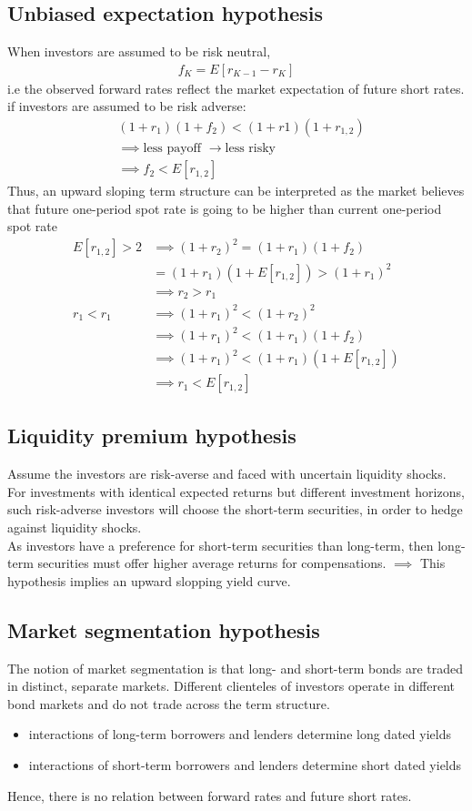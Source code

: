 \documentclass{article}
\theoremstyle{definition}
\theoremstyle{thrm}
\theoremstyle{lma}
\theoremstyle{ppst}
\theoremstyle{crlr}
\begin{document}
\subsection{Unbiased expectation hypothesis}
When investors are assumed to be risk neutral, 
\begin{align*}
	f_K = E[r_{K-1}-r_K]
\end{align*}
i.e the observed forward rates reflect the market expectation of future short rates.\\
if investors are assumed to be risk adverse:
\begin{align*}
	&(1+r_1)(1+f_2)< (1+r1)(1+r_{1,2})\\
	&\implies \text{less payoff } \rightarrow \text{less risky}\\
	&\implies f_2 < E[r_{1,2}]
\end{align*}
Thus, an upward sloping term structure can be interpreted as the market believes that future one-period spot rate is going to be higher than current one-period spot rate
\begin{align*}
	E[r_{1,2}] > 2 &\implies (1+r_2)^2 = (1+r_1)(1+f_2)\\
	&= (1+r_1)(1+E[r_{1,2}]) > (1+r_1)^2\\
	&\implies r_2>r_1\\
	r_1<r_1 &\implies (1+r_1)^2 < (1+r_2)^2\\
	&\implies (1+r_1)^2 < (1+r_1)(1+f_2)\\
	&\implies (1+r_1)^2 < (1+r_1)(1+E[r_{1,2}])\\
	&\implies r_1 < E[r_{1,2}]
\end{align*}
\subsection{Liquidity premium hypothesis}
Assume the investors are risk-averse and faced with uncertain liquidity shocks. For investments with identical expected returns but different investment horizons, such risk-adverse investors will choose the short-term securities, in order to hedge against liquidity shocks. \\
As investors have a preference for short-term securities than long-term, then long-term securities must offer higher average returns for compensations.
$\implies$ This hypothesis implies an upward slopping yield curve.
\subsection{Market segmentation hypothesis}
The notion of market segmentation is that long- and short-term bonds are traded in distinct, separate markets. Different clienteles of investors operate in different bond markets and do not trade across the term structure. 
\begin{itemize}
	\item interactions of long-term borrowers and lenders determine long dated yields
	\item interactions of short-term borrowers and lenders determine short dated yields
\end{itemize}
Hence, there is no relation between forward rates and future short rates. 
\end{document}

